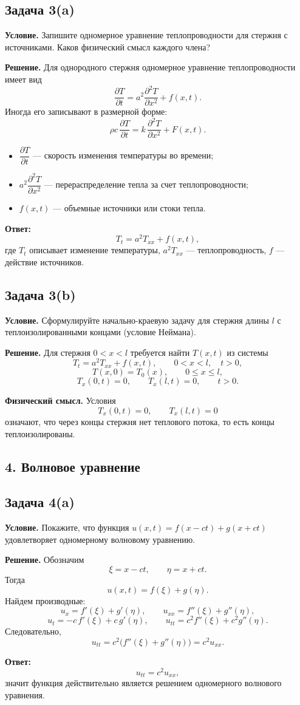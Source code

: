 \documentclass[a4paper,12pt]{article}
\newcommand{\Task}[2]{\subsection*{Задача #1}\textbf{Условие.} #2}
\newcommand{\Solution}{\textbf{Решение.}}
\begin{document}
\Task{3(a)}{Запишите одномерное уравнение теплопроводности для стержня с источниками. Каков физический смысл каждого члена?}

\Solution
Для однородного стержня одномерное уравнение теплопроводности имеет вид
\[
\frac{\partial T}{\partial t}=a^2\frac{\partial^2 T}{\partial x^2}+f(x,t).
\]
Иногда его записывают в размерной форме:
\[
\rho c\,\frac{\partial T}{\partial t}=k\,\frac{\partial^2 T}{\partial x^2}+F(x,t).
\]

\begin{itemize}
  \item $\dfrac{\partial T}{\partial t}$ --- скорость изменения температуры во времени;
  \item $a^2\dfrac{\partial^2 T}{\partial x^2}$ --- перераспределение тепла за счет теплопроводности;
  \item $f(x,t)$ --- объемные источники или стоки тепла.
\end{itemize}

\textbf{Ответ:}
\[
T_t=a^2T_{xx}+f(x,t),
\]
где $T_t$ описывает изменение температуры,
$a^2T_{xx}$ --- теплопроводность,
$f$ --- действие источников.

\Task{3(b)}{Сформулируйте начально-краевую задачу для стержня длины $l$ с теплоизолированными концами (условие Неймана).}

\Solution
Для стержня $0<x<l$ требуется найти $T(x,t)$ из системы
\[
T_t=a^2T_{xx}+f(x,t), \qquad 0<x<l,\quad t>0,
\]
\[
T(x,0)=T_0(x), \qquad 0\le x\le l,
\]
\[
T_x(0,t)=0, \qquad T_x(l,t)=0, \qquad t>0.
\]

\textbf{Физический смысл.} Условия
\[
T_x(0,t)=0, \qquad T_x(l,t)=0
\]
означают, что через концы стержня нет теплового потока, то есть концы теплоизолированы.

\subsection*{4. Волновое уравнение}

\Task{4(a)}{Покажите, что функция $u(x,t)=f(x-ct)+g(x+ct)$ удовлетворяет одномерному волновому уравнению.}

\Solution
Обозначим
\[
\xi=x-ct, \qquad \eta=x+ct.
\]
Тогда
\[
u(x,t)=f(\xi)+g(\eta).
\]
Найдем производные:
\[
u_x=f'(\xi)+g'(\eta), \qquad
u_{xx}=f''(\xi)+g''(\eta),
\]
\[
u_t=-c\,f'(\xi)+c\,g'(\eta), \qquad
u_{tt}=c^2f''(\xi)+c^2g''(\eta).
\]
Следовательно,
\[
u_{tt}=c^2\bigl(f''(\xi)+g''(\eta)\bigr)=c^2u_{xx}.
\]

\textbf{Ответ:}
\[
u_{tt}=c^2u_{xx},
\]
значит функция действительно является решением одномерного волнового уравнения.
\end{document}
